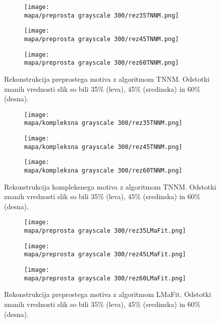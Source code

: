 \begin{figure}[!ht]
    \begin{subfigure}{0.325\linewidth}
        \texttt{[image: \\mapa/preprosta grayscale 300/rez35TNNM.png]}
    \end{subfigure}
    \hfill
    \begin{subfigure}{0.325\linewidth}
        \texttt{[image: \\mapa/preprosta grayscale 300/rez45TNNM.png]}
    \end{subfigure}
    \hfill
    \begin{subfigure}{0.325\linewidth}
        \texttt{[image: \\mapa/preprosta grayscale 300/rez60TNNM.png]}
    \end{subfigure}
    \caption{Rekonstrukcija preprostega motiva z algoritmom TNNM. Odstotki znanih vrednosti slik so bili 35\% (leva), 45\% (sredinska) in 60\% (desna).}
\end{figure}

\begin{figure}[!ht]
    \begin{subfigure}{0.325\linewidth}
        \texttt{[image: \\mapa/kompleksna grayscale 300/rez35TNNM.png]}
    \end{subfigure}
    \hfill
    \begin{subfigure}{0.325\linewidth}
        \texttt{[image: \\mapa/kompleksna grayscale 300/rez45TNNM.png]}
    \end{subfigure}
    \hfill
    \begin{subfigure}{0.325\linewidth}
        \texttt{[image: \\mapa/kompleksna grayscale 300/rez60TNNM.png]}
    \end{subfigure}
    \caption{Rekonstrukcija kompleksnega motiva z algoritmom TNNM. Odstotki znanih vrednosti slik so bili 35\% (leva), 45\% (sredinska) in 60\% (desna).}
\end{figure}

\begin{figure}[!ht]
    \begin{subfigure}{0.325\linewidth}
        \texttt{[image: \\mapa/preprosta grayscale 300/rez35LMaFit.png]}
    \end{subfigure}
    \hfill
    \begin{subfigure}{0.325\linewidth}
        \texttt{[image: \\mapa/preprosta grayscale 300/rez45LMaFit.png]}
    \end{subfigure}
    \hfill
    \begin{subfigure}{0.325\linewidth}
        \texttt{[image: \\mapa/preprosta grayscale 300/rez60LMaFit.png]}
    \end{subfigure}
    \caption{Rekonstrukcija preprostega motiva z algoritmom LMaFit. Odstotki znanih vrednosti slik so bili 35\% (leva), 45\% (sredinska) in 60\% (desna).}
\end{figure}

